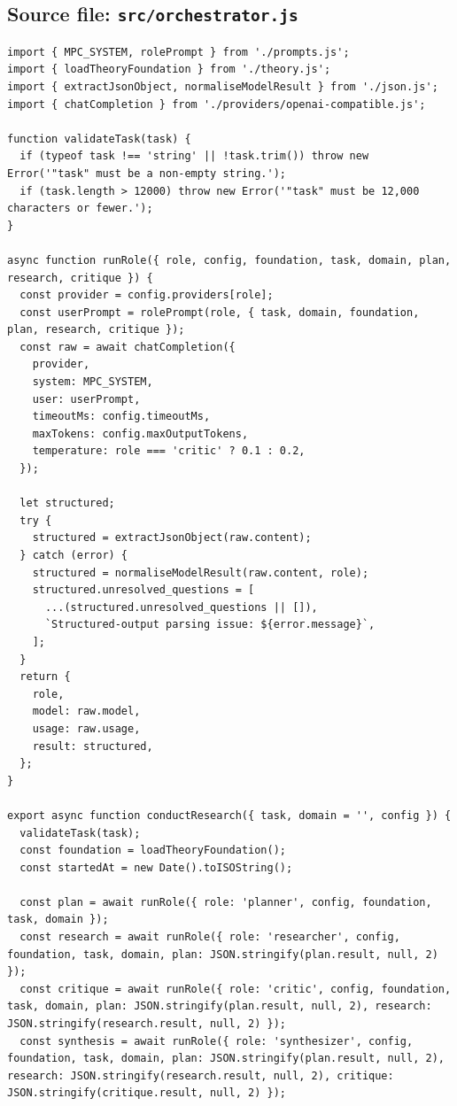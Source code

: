 \documentclass[10pt,a4paper]{article}
\begin{document}
\subsection{Source file: \texttt{src/orchestrator.js}}
\begin{lstlisting}
import { MPC_SYSTEM, rolePrompt } from './prompts.js';
import { loadTheoryFoundation } from './theory.js';
import { extractJsonObject, normaliseModelResult } from './json.js';
import { chatCompletion } from './providers/openai-compatible.js';

function validateTask(task) {
  if (typeof task !== 'string' || !task.trim()) throw new Error('"task" must be a non-empty string.');
  if (task.length > 12000) throw new Error('"task" must be 12,000 characters or fewer.');
}

async function runRole({ role, config, foundation, task, domain, plan, research, critique }) {
  const provider = config.providers[role];
  const userPrompt = rolePrompt(role, { task, domain, foundation, plan, research, critique });
  const raw = await chatCompletion({
    provider,
    system: MPC_SYSTEM,
    user: userPrompt,
    timeoutMs: config.timeoutMs,
    maxTokens: config.maxOutputTokens,
    temperature: role === 'critic' ? 0.1 : 0.2,
  });

  let structured;
  try {
    structured = extractJsonObject(raw.content);
  } catch (error) {
    structured = normaliseModelResult(raw.content, role);
    structured.unresolved_questions = [
      ...(structured.unresolved_questions || []),
      `Structured-output parsing issue: ${error.message}`,
    ];
  }
  return {
    role,
    model: raw.model,
    usage: raw.usage,
    result: structured,
  };
}

export async function conductResearch({ task, domain = '', config }) {
  validateTask(task);
  const foundation = loadTheoryFoundation();
  const startedAt = new Date().toISOString();

  const plan = await runRole({ role: 'planner', config, foundation, task, domain });
  const research = await runRole({ role: 'researcher', config, foundation, task, domain, plan: JSON.stringify(plan.result, null, 2) });
  const critique = await runRole({ role: 'critic', config, foundation, task, domain, plan: JSON.stringify(plan.result, null, 2), research: JSON.stringify(research.result, null, 2) });
  const synthesis = await runRole({ role: 'synthesizer', config, foundation, task, domain, plan: JSON.stringify(plan.result, null, 2), research: JSON.stringify(research.result, null, 2), critique: JSON.stringify(critique.result, null, 2) });


\end{lstlisting}
\end{document}
